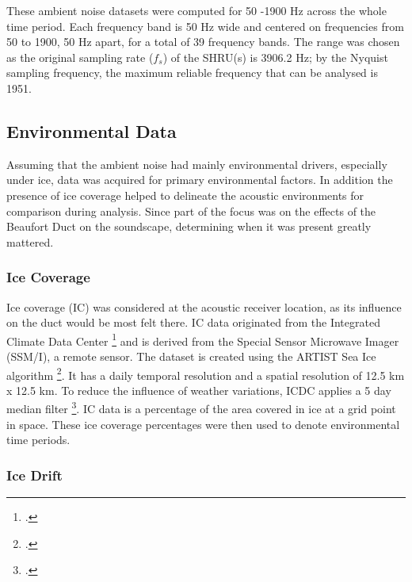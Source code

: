 
These ambient noise datasets were computed for 50 -1900 Hz across the whole time period. Each frequency band is 50 Hz wide and centered on frequencies from 50 to 1900, 50 Hz apart, for a total of 39 frequency bands. The range was chosen as the original sampling rate ($f_{s}$) of the SHRU(s) is  3906.2 Hz; by the Nyquist sampling frequency, the maximum reliable frequency that can be analysed is 1951.

\subsection{Environmental Data} \label{intro_env_info}

Assuming that the ambient noise had mainly environmental drivers, especially under ice, data was acquired for primary environmental factors. In addition the presence of ice coverage helped to delineate the acoustic environments for comparison during analysis. Since part of the focus was on the effects of the Beaufort Duct on the soundscape, determining when it was present greatly mattered.
\subsubsection{Ice Coverage} \label{intro_env_ice_cov}

Ice coverage (IC) was considered at the acoustic receiver location, as its influence on the duct would be most felt there. IC data originated from the Integrated Climate Data Center \footcite[]{kaleschke2001ssm} and is derived from the Special Sensor Microwave Imager (SSM/I), a remote sensor. The dataset is created using the ARTIST Sea Ice algorithm \footcite[]{spreen2008sea}. It has a daily temporal resolution and a spatial resolution of 12.5 km x 12.5 km. To reduce the influence of weather variations, ICDC applies a 5 day median filter \footcite[]{kern2010climatology}. IC data is a percentage of the area covered in ice at a grid point in space. These ice coverage percentages were then used to denote environmental time periods.

\subsubsection{Ice Drift} \label{intro_env_ice_dri}

